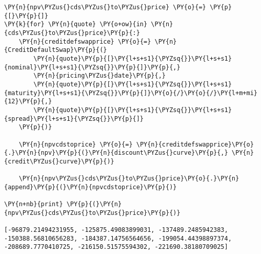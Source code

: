 \begin{Answer}
\begin{tcolorbox}[size=fbox, boxrule=1pt,colback=cellbackground, colframe=cellborder]
\begin{Verbatim}[commandchars=\\\{\}]
\end{Verbatim}
\end{tcolorbox}

\begin{tcolorbox}[size=fbox, boxrule=1pt,colback=cellbackground, colframe=cellborder]
\begin{Verbatim}[commandchars=\\\{\}]
\PY{n}{npv\PYZus{}cds\PYZus{}to\PYZus{}price} \PY{o}{=} \PY{p}{[}\PY{p}{]}
\PY{k}{for} \PY{n}{quote} \PY{o+ow}{in} \PY{n}{cds\PYZus{}to\PYZus{}price}\PY{p}{:}
    \PY{n}{creditdefswapprice} \PY{o}{=} \PY{n}{CreditDefaultSwap}\PY{p}{(}
        \PY{n}{quote}\PY{p}{[}\PY{l+s+s1}{\PYZsq{}}\PY{l+s+s1}{nominal}\PY{l+s+s1}{\PYZsq{}}\PY{p}{]}\PY{p}{,}              
        \PY{n}{pricing\PYZus{}date}\PY{p}{,}
        \PY{n}{quote}\PY{p}{[}\PY{l+s+s1}{\PYZsq{}}\PY{l+s+s1}{maturity}\PY{l+s+s1}{\PYZsq{}}\PY{p}{]}\PY{o}{/}\PY{o}{/}\PY{l+m+mi}{12}\PY{p}{,}
        \PY{n}{quote}\PY{p}{[}\PY{l+s+s1}{\PYZsq{}}\PY{l+s+s1}{spread}\PY{l+s+s1}{\PYZsq{}}\PY{p}{]}   
    \PY{p}{)}

    \PY{n}{npvcdstoprice} \PY{o}{=} \PY{n}{creditdefswapprice}\PY{o}{.}\PY{n}{npv}\PY{p}{(}\PY{n}{discount\PYZus{}curve}\PY{p}{,} \PY{n}{credit\PYZus{}curve}\PY{p}{)}
    
    \PY{n}{npv\PYZus{}cds\PYZus{}to\PYZus{}price}\PY{o}{.}\PY{n}{append}\PY{p}{(}\PY{n}{npvcdstoprice}\PY{p}{)}

\PY{n+nb}{print} \PY{p}{(}\PY{n}{npv\PYZus{}cds\PYZus{}to\PYZus{}price}\PY{p}{)}

[-96879.21494231955, -125875.49083899031, -137489.2485942383,
-150388.56810656283, -184387.14756564656, -199054.44398897374,
-208689.7770410725, -216150.51575594302, -221690.38180709025]
    \end{Verbatim}
\end{tcolorbox}
\end{Answer}
